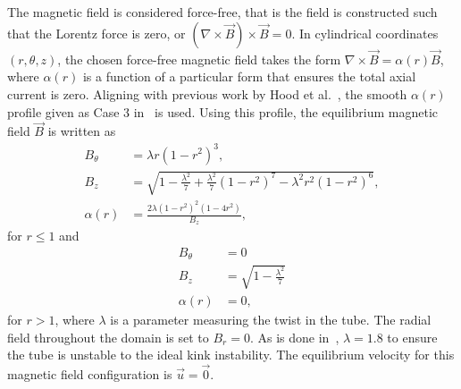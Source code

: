 The magnetic field is considered force-free, that is the field is constructed such that the Lorentz force is zero, or $(\nabla \times \vec{B})\times \vec{B} = 0$. In cylindrical coordinates $(r,\theta,z)$, the chosen force-free magnetic field takes the form $\nabla \times \vec{B} = \alpha(r)\vec{B}$, where $\alpha(r)$ is a function of a particular form that ensures the total axial current is zero. Aligning with previous work by Hood et al.~\cite{hoodCoronalHeatingMagnetic2009}, the smooth $\alpha(r)$ profile given as Case 3 in~\cite{hoodCoronalHeatingMagnetic2009} is used. Using this profile, the equilibrium magnetic field $\vec{B}$ is written as 
\begin{equation}
\begin{aligned}
  \label{eq:field-profile-r-lt-1}
  B_{\theta} &= \lambda r {(1 - r^2)}^3,\\
  B_z &= \sqrt{1 - \frac{\lambda^2}{7} + \frac{\lambda^2}{7}{(1 - r^2)}^7 - \lambda^2 r^2 {(1-r^2)}^6},\\
  \alpha(r) &= \frac{2 \lambda {(1-r^2)}^2 {(1-4r^2)}}{B_z},
\end{aligned}
\end{equation}
for $r \leq 1$ and
\begin{equation}
\begin{aligned}
  \label{eq:field-profile-r-gt-1}
  B_{\theta} &= 0 \\
  B_z &= \sqrt{1 - \frac{\lambda^2}{7}}\\
  \alpha(r) &= 0 ,
\end{aligned}
\end{equation}
for $r > 1$, where $\lambda$ is a parameter measuring the twist in the tube. The radial field throughout the domain is set to $B_r = 0$. As is done in~\cite{hoodCoronalHeatingMagnetic2009}, $\lambda = 1.8$ to ensure the tube is unstable to the ideal kink instability. The equilibrium velocity for this magnetic field configuration is $\vec{u} = \vec{0}$.

